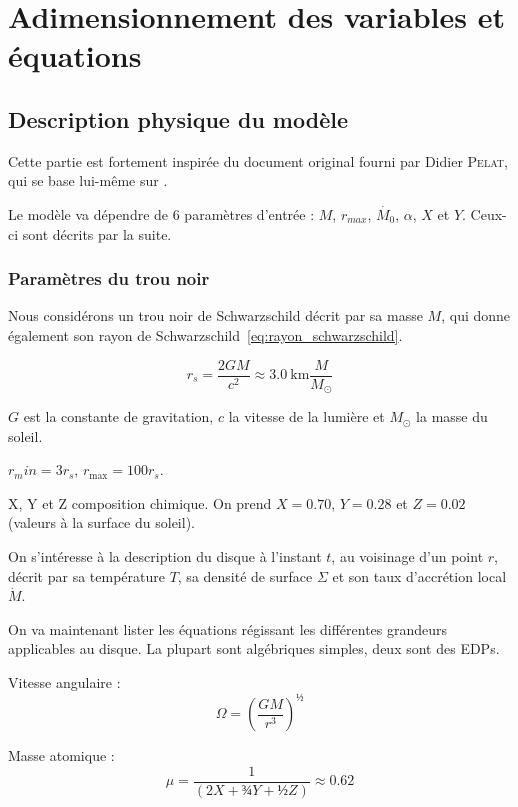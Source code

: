 \section{Adimensionnement des variables et équations}

\subsection{Description physique du modèle}

Cette partie est fortement inspirée du document original fourni par Didier
\textsc{Pelat}, qui se base lui-même sur \citet{1984}.

Le modèle va dépendre de 6 paramètres d’entrée : $M$, $r_{max}$, $\dot{M_0}$, $\alpha$,
$X$ et $Y$. Ceux-ci sont décrits par la suite.

\subsubsection{Paramètres du trou noir}

Nous considérons un trou noir de Schwarzschild décrit par sa masse $M$, qui donne également son rayon de Schwarzschild~\eqref{eq:rayon_schwarzschild}.

\begin{equation}
    \label{eq:rayon_schwarzschild}
    r_s = \frac{2 G M}{c^2} \approx \SI{3.0}{\kilo\meter} \frac{M}{M_{\odot}}
\end{equation}

$G$ est la constante de gravitation, $c$ la vitesse de la lumière et $M_{\odot}$ la masse du soleil.

$r_min = 3 r_s$, $r_\mathrm{max} = 100 r_s$.

X, Y et Z composition chimique. On prend $X = \num{0.70}$, $Y = \num{0.28}$ et $Z = \num{0.02}$ (valeurs à la surface du soleil).

On s’intéresse à la description du disque à l’instant $t$, au voisinage d’un point $r$, décrit par sa température $T$, sa densité de surface $\Sigma$ et son taux d’accrétion local $\dot{M}$.

On va maintenant lister les équations régissant les différentes grandeurs applicables au disque. La plupart sont algébriques simples, deux sont des EDPs.

Vitesse angulaire : 
\begin{equation}
    \Omega = \left( \frac{G M}{r^3} \right)^½
\end{equation}

Masse atomique :
\begin{equation}
    \mu = \frac{1}{\left(2X + ¾Y + ½Z\right)} \approx 0.62
\end{equation}

